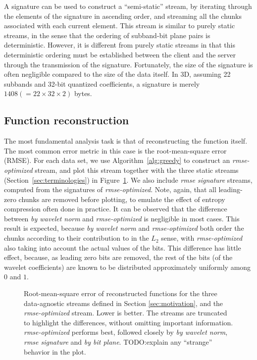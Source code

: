 A signature can be used to construct a ``semi-static'' stream, by iterating through the elements of
the signature in ascending order, and streaming all the chunks associated with each current element.
This stream is similar to purely static streams, in the sense that the ordering of subband-bit plane
pairs is deterministic. However, it is different from purely static streams in that this
deterministic ordering must be established between the client and the server through the
transmission of the signature. Fortunately, the size of the signature is often negligible compared
to the size of the data itself. In 3D, assuming 22 subbands and 32-bit quantized coefficients, a
signature is merely $1408 (=22\times 32\times 2)$ bytes.

\subsection{Function reconstruction}
\label{sec:rmse-optimized}

The most fundamental analysis task is that of reconstructing the function itself. The most common
error metric in this case is the root-mean-square error (RMSE). For each data set, we use
Algorithm~\ref{alg:greedy} to construct an \emph{rmse-optimized} stream, and plot this stream
together with the three static streams (Section~\ref{sec:terminologies}) in
Figure~\ref{fig:rmse-optimized}. We also include \emph{rmse signature} streams, computed from the
signatures of \emph{rmse-optimized}. Note, again, that all leading-zero chunks are removed before
plotting, to emulate the effect of entropy compression often done in practice. It can be observed
that the difference between \emph{by wavelet norm} and \emph{rmse-optimized} is negligible in most
cases. This result is expected, because \emph{by wavelet norm} and \emph{rmse-optimized} both order
the chunks according to their contribution to in the $L_2$ sense, with \emph{rmse-optimized} also
taking into account the actual values of the bits. This difference has little effect, because, as
leading zero bits are removed, the rest of the bits (of the wavelet coefficients) are known to be
distributed approximately uniformly among $0$ and $1$.

\begin{figure}[h]
  \centering
  \caption{Root-mean-square error of reconstructed functions for the three data-agnostic streams
  defined in Section \ref{sec:motivation}, and the \emph{rmse-optimized} stream. Lower is better.
  The streams are truncated to highlight the differences, without omitting important information.
  \emph{rmse-optimized} performs best, followed closely by \emph{by wavelet norm}, \emph{rmse
  signature} and \emph{by bit plane}. TODO:explain any ``strange'' behavior in the plot.}
 	\label{fig:rmse-optimized}
\end{figure}

